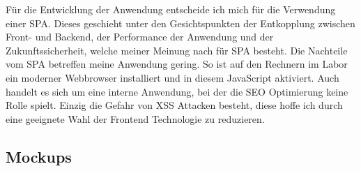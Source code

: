Für die Entwicklung der Anwendung entscheide ich mich für die Verwendung einer SPA. Dieses geschieht unter den Gesichtspunkten der Entkopplung zwischen Front- und Backend, der Performance der Anwendung und der Zukunftssicherheit, welche meiner Meinung nach für SPA besteht. Die Nachteile vom SPA betreffen meine Anwendung gering. So ist auf den Rechnern im Labor ein moderner Webbrowser installiert und in diesem JavaScript aktiviert. Auch handelt es sich um eine interne Anwendung, bei der die SEO Optimierung keine Rolle spielt. Einzig die Gefahr von XSS Attacken besteht, diese hoffe ich durch eine geeignete Wahl der Frontend Technologie zu reduzieren.\cite{melnikSinglePageApplication2020}

\subsection{Mockups} \label{subsec:Mockup}